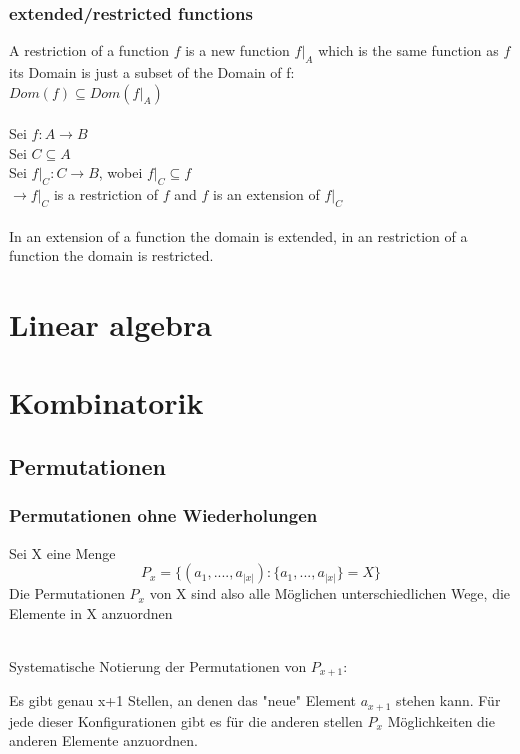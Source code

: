 \documentclass[12pt, letterpaper]{article}
\begin{document}
\subsubsection{extended/restricted functions}
\label{sec: extended/restricted functions}
A restriction of a function $f$ is a new function $f|_{A}$ which is the same function as $f$ its Domain is just a subset of the Domain of f:\\
$Dom(f)\subseteq Dom(f|_{A})$\\\\
Sei $f: A \rightarrow B$\\
Sei $C\subseteq A$\\
Sei $f|_{C}: C\rightarrow B$, wobei $f|_{C}\subseteq f$
\\$\rightarrow f|_{C}$ is a restriction of $f$ and $f$ is an extension of $f|_{C}$\\\\
In an extension of a function the domain is extended, in an restriction of a function the domain is restricted.

\newpage
\section{Linear algebra}
\label{sec:linear algebra}

\newpage

\section{Kombinatorik}
\label{sec:Kombinatorik}
\subsection{Permutationen}
\label{sec:Permutationen}
\subsubsection{Permutationen ohne Wiederholungen}
\label{sec:Permutationen ohne Wiederholungen}

Sei X eine Menge\\
\[	
	P_{x} = \{(a_{1}, ...., a_{|x|}): \{a_{1}, ..., a_{|x|} \}= X\}
\]
Die Permutationen $P_{x}$ von X sind also alle Möglichen unterschiedlichen Wege, die Elemente in X anzuordnen

\\Systematische Notierung der Permutationen von $P_{x+1}$:

Es gibt genau x+1 Stellen, an denen das "neue" Element $a_{x+1}$ stehen kann. Für jede dieser Konfigurationen gibt es für die anderen stellen $P_{x}$ Möglichkeiten die anderen Elemente anzuordnen.
\end{document}
